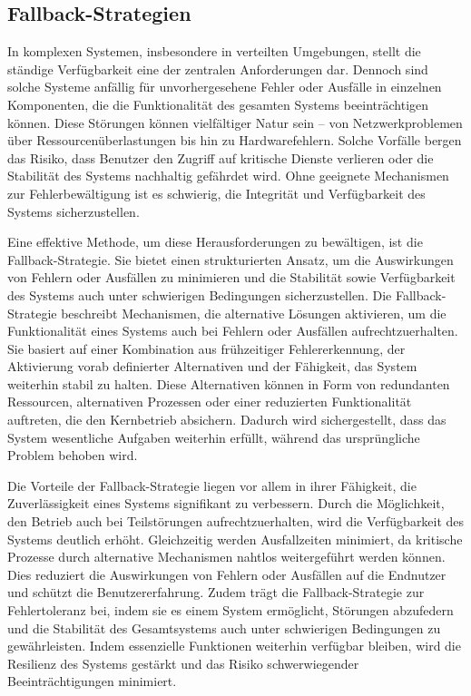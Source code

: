 \subsection{Fallback-Strategien}
In komplexen Systemen, insbesondere in verteilten Umgebungen, stellt die ständige Verfügbarkeit eine der zentralen Anforderungen dar. Dennoch sind solche Systeme anfällig für unvorhergesehene Fehler oder Ausfälle in einzelnen Komponenten, die die Funktionalität des gesamten Systems beeinträchtigen können. Diese Störungen können vielfältiger Natur sein – von Netzwerkproblemen über Ressourcenüberlastungen bis hin zu Hardwarefehlern. Solche Vorfälle bergen das Risiko, dass Benutzer den Zugriff auf kritische Dienste verlieren oder die Stabilität des Systems nachhaltig gefährdet wird. Ohne geeignete Mechanismen zur Fehlerbewältigung ist es schwierig, die Integrität und Verfügbarkeit des Systems sicherzustellen.

Eine effektive Methode, um diese Herausforderungen zu bewältigen, ist die Fallback-Strategie. Sie bietet einen strukturierten Ansatz, um die Auswirkungen von Fehlern oder Ausfällen zu minimieren und die Stabilität sowie Verfügbarkeit des Systems auch unter schwierigen Bedingungen sicherzustellen. Die Fallback-Strategie beschreibt Mechanismen, die alternative Lösungen aktivieren, um die Funktionalität eines Systems auch bei Fehlern oder Ausfällen aufrechtzuerhalten. Sie basiert auf einer Kombination aus frühzeitiger Fehlererkennung, der Aktivierung vorab definierter Alternativen und der Fähigkeit, das System weiterhin stabil zu halten. Diese Alternativen können in Form von redundanten Ressourcen, alternativen Prozessen oder einer reduzierten Funktionalität auftreten, die den Kernbetrieb absichern. Dadurch wird sichergestellt, dass das System wesentliche Aufgaben weiterhin erfüllt, während das ursprüngliche Problem behoben wird.

Die Vorteile der Fallback-Strategie liegen vor allem in ihrer Fähigkeit, die Zuverlässigkeit eines Systems signifikant zu verbessern. Durch die Möglichkeit, den Betrieb auch bei Teilstörungen aufrechtzuerhalten, wird die Verfügbarkeit des Systems deutlich erhöht. Gleichzeitig werden Ausfallzeiten minimiert, da kritische Prozesse durch alternative Mechanismen nahtlos weitergeführt werden können. Dies reduziert die Auswirkungen von Fehlern oder Ausfällen auf die Endnutzer und schützt die Benutzererfahrung. Zudem trägt die Fallback-Strategie zur Fehlertoleranz bei, indem sie es einem System ermöglicht, Störungen abzufedern und die Stabilität des Gesamtsystems auch unter schwierigen Bedingungen zu gewährleisten. Indem essenzielle Funktionen weiterhin verfügbar bleiben, wird die Resilienz des Systems gestärkt und das Risiko schwerwiegender Beeinträchtigungen minimiert.
